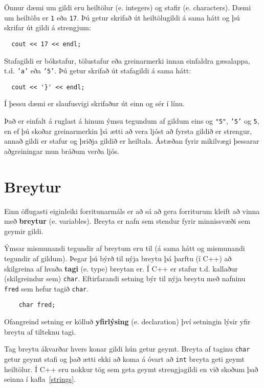 Önnur dæmi um gildi eru heiltölur (e. integers) og stafir (e. characters).
Dæmi um heiltölu er {\tt 1} eða {\tt 17}. 
Þú getur skrifað út heiltölugildi á sama hátt og þú skrifar út gildi á strengjum:

\begin{verbatim}
  cout << 17 << endl;
\end{verbatim}
%
Stafagildi er bókstafur, tölustafur eða greinarmerki innan einfaldra gæsalappa, t.d. {\tt 'a'} eða {\tt '5'}.
Þú getur skrifað út stafagildi á sama hátt:

\begin{verbatim}
  cout << '}' << endl;
\end{verbatim}
%
Í þessu dæmi er slaufusvigi skrifaður út einn og sér í línu.

Það er einfalt á ruglast á hinum ýmsu tegundum af gildum eins og 
{\tt "5"}, {\tt '5'} og {\tt 5}, en ef þú skoðar greinarmerkin þá ætti að vera ljóst að
fyrsta gildið er strengur, annað gildi er stafur og þriðja gildið er heiltala.
Ástæðan fyrir mikilvægi þessarar aðgreiningar mun bráðum verða ljós.

\section {Breytur}

Einn öflugasti eiginleiki forritunarmáls er að sá að gera forriturum kleift að vinna með {\bf breytur} (e. variables).
Breyta er nafn sem stendur fyrir minnissvæði sem geymir gildi. 

Ýmsar mismunandi tegundir af breytum eru til (á sama hátt og mismunandi tegundir af gildum).
Þegar þú býrð til nýja breytu þá þarftu (í C++) að skilgreina af hvaða {\bf tagi} (e. type) breytan er.
Í C++ er stafur t.d. kallaður (skilgreindur sem) {\tt char}.
Eftirfarandi setning býr til nýja breytu með nafninu {\tt fred} sem hefur tagið {\tt char}.

\begin{verbatim}
    char fred;
\end{verbatim}
%
Ofangreind setning er kölluð {\bf yfirlýsing} (e. declaration) því setningin lýsir yfir breytu af tilteknu tagi.

Tag breytu ákvarðar hvers konar gildi hún getur geymt.
Breyta af taginu {\tt char} getur geymt stafi og það ætti ekki að koma á óvart að {\tt int} breyta geti geymt heiltölur.
Í C++ eru nokkur tög sem geta geymt strengjagildi en við skoðum það seinna í kafla~\ref{strings}.

